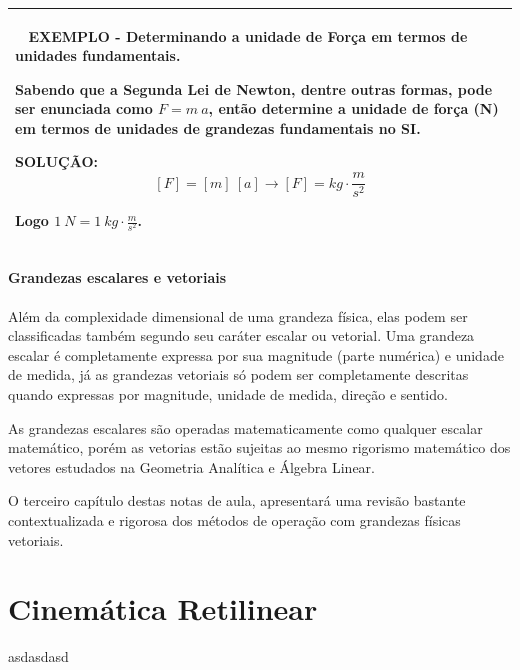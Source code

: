 \documentclass[a4paper, 11pt]{report}
\newenvironment{myboxed}
    {
        \begin{center}
        \begin{tabular}{p{0.7\textwidth}}
        \hline\
    }
    { 
        \\\hline
        \end{tabular} 
        \end{center}
    }
\begin{document}
\begin{myboxed}
    \textbf{EXEMPLO - Determinando a unidade de Força em termos de unidades
    fundamentais.}

    Sabendo que a Segunda Lei de Newton, dentre outras formas, pode ser 
    enunciada como $F = m \: a$, então determine a unidade de força (N) em 
    termos de unidades de grandezas fundamentais no SI.

    \textbf{SOLUÇÃO:}
    $$
    [F] = [m] \: [a] \rightarrow
    [F] = kg \cdot \frac{m}{s^2}
    $$

    Logo $1 \: N = 1 \: kg \cdot \frac{m}{s^2}$.

\end{myboxed}

\subsubsection{Grandezas escalares e vetoriais}

Além da complexidade dimensional de uma grandeza física, elas podem ser 
classificadas também segundo seu caráter escalar ou vetorial. Uma grandeza 
escalar é completamente expressa por sua magnitude (parte numérica) e unidade
de medida, já as grandezas vetoriais só podem ser completamente descritas 
quando expressas por magnitude, unidade de medida, direção e sentido. 

As grandezas escalares são operadas matematicamente como qualquer escalar 
matemático, porém as vetorias estão sujeitas ao mesmo rigorismo matemático 
dos vetores estudados na Geometria Analítica e Álgebra Linear. 

O terceiro capítulo destas notas de aula, apresentará uma revisão bastante 
contextualizada e rigorosa dos métodos de operação com grandezas físicas
vetoriais.

\chapter{Cinemática Retilinear}

asdasdasd

\label{lastpage}
\end{document}
